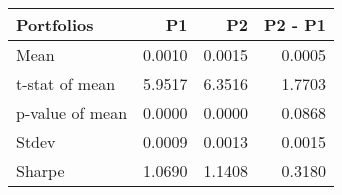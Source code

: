 \begin{tabular}{lrrr}
\toprule
Portfolios & P1 & P2 & P2 - P1 \\
\midrule
Mean & 0.0010 & 0.0015 & 0.0005 \\
t-stat of mean & 5.9517 & 6.3516 & 1.7703 \\
p-value of mean & 0.0000 & 0.0000 & 0.0868 \\
Stdev & 0.0009 & 0.0013 & 0.0015 \\
Sharpe & 1.0690 & 1.1408 & 0.3180 \\
\bottomrule
\end{tabular}
